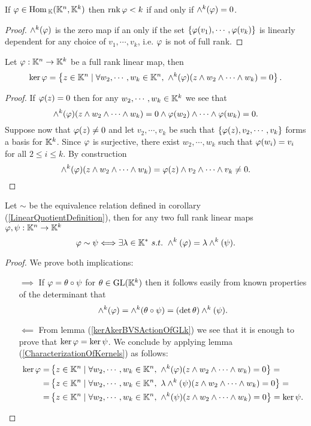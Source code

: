 \begin{lemma}\label{WhenPluckerMapIsZero}
If $\varphi\in\mathrm{Hom}\,_{\mathbb{K}}(\mathbb{K}^n,\mathbb{K}^k)$ then $\mathrm{rnk}\, \varphi<k$ if and only if $\wedge^k(\varphi)=0$.
\end{lemma}
\begin{proof}
$\wedge^k(\varphi)$ is the zero map if an only if the set $\left\{{\varphi(v_1),\cdots, \varphi(v_k)}\right\}$ is linearly dependent for any choice of $v_1,\cdots, v_k$, i.e. $\varphi$ is not of full rank.
\end{proof}

\begin{lemma}\label{CharacterizationOfKernels}
Let $\varphi:\mathbb{K}^n\to \mathbb{K}^k$ be a full rank linear map, then
\[\ker\varphi=\left\{{z\in\mathbb{K}^n\mid \forall w_2,\cdots, w_k\in \mathbb{K}^n,\ \wedge^k(\varphi)(z\wedge w_2\wedge\cdots\wedge w_k)=0}\right\}.\]
\end{lemma}
\begin{proof}
If $\varphi(z)=0$ then for any $w_2,\cdots, w_k\in \mathbb{K}^k$ we see that 
\[\wedge^k(\varphi)(z\wedge w_2\wedge\cdots\wedge w_k)=0\wedge \varphi(w_2)\wedge\cdots\wedge \varphi(w_k)=0.\]
Suppose now that $\varphi(z)\neq 0$ and let $v_2,\cdots, v_k$ be such that $\left\{{\varphi(z), v_2,\cdots,v_k}\right\}$ forms a basis for $\mathbb{K}^k$. Since $\varphi$ is surjective, there exist $w_2,\cdots, w_k$ such that $\varphi(w_i)=v_i$ for all $2\leq i\leq k$.
By construction 
\[\wedge^k(\varphi)(z\wedge w_2\wedge\cdots\wedge w_k)=\varphi(z)\wedge v_2\wedge\cdots\wedge v_k\neq0.\]
\end{proof}

\begin{proposition}\label{PluckerMapInjectiveOnGrassmanniansUpToScalar}
Let $\sim$ be the equivalence relation defined in corollary (\ref{LinearQuotientDefinition}), then for any two full rank linear maps $\varphi,\psi:\mathbb{K}^n\to \mathbb{K}^k$
\[\vp\sim \psi\coimplies \exists \la\in\K^\ast\ s.t.\ \wedge^k(\vp)=\la\wedge^k(\psi).\]
\end{proposition}
\begin{proof}
We prove both implications:
\setlength{\leftmargini}{0cm}
\begin{itemize}
\item[$\boxed{\implies}$] If $\varphi=\theta\circ \psi$ for $\theta\in \mathrm{GL}(\mathbb{K}^k)$ then it follows easily from known properties of the determinant that \[\wedge^k(\varphi)=\wedge^k(\theta\circ \psi)=(\det\theta) \wedge^k(\psi).\]
\item[$\boxed{\impliedby}$] From lemma (\ref{kerAkerBVSActionOfGLk}) we see that it is enough to prove that $\ker \varphi=\ker \psi$. We conclude by applying lemma (\ref{CharacterizationOfKernels}) as follows:
\begin{align*}
\ker\vp=&\cpa{z\in\K^n\mid \forall w_2,\cdots, w_k\in \K^n,\ \wedge^k(\vp)(z\wedge w_2\wedge \cdots\wedge w_k)=0}=\\
=&\cpa{z\in\K^n\mid \forall w_2,\cdots, w_k\in \K^n,\ \la\wedge^k(\psi)(z\wedge w_2\wedge\cdots\wedge w_k)=0}=\\
=&\cpa{z\in\K^n\mid \forall w_2,\cdots, w_k\in \K^n,\ \wedge^k(\psi)(z\wedge w_2\wedge \cdots\wedge w_k)=0}=\ker \psi.
\end{align*}
\end{itemize}
\setlength{\leftmargini}{0.5cm}
\end{proof}

